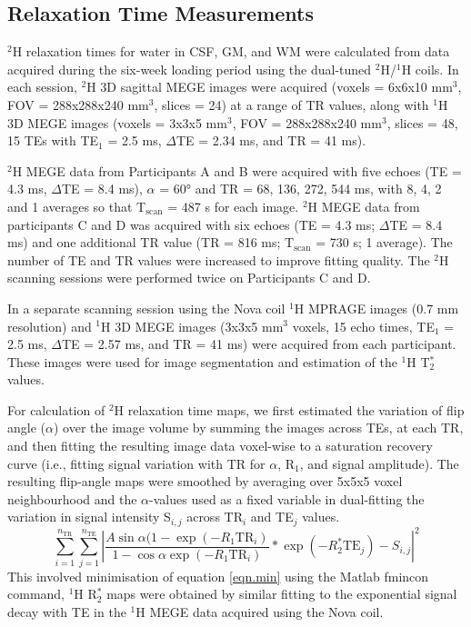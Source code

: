 \subsection{Relaxation Time Measurements}
\label{Chap:D2O:Relaxation}

$^2$H relaxation times for water in \ac{CSF}, \ac{GM}, and \ac{WM} were calculated from data acquired during the six-week loading period using the dual-tuned $^2$H/$^1$H coils. In each session, $^2$H 3D sagittal \ac{MEGE} images were acquired (voxels = 6x6x10 mm$^3$, \ac{FOV} = 288x288x240 mm$^3$, slices = 24) at a range of \ac{TR} values, along with $^1$H 3D \ac{MEGE} images (voxels = 3x3x5 mm$^3$, \ac{FOV} = 288x288x240 mm$^3$, slices = 48, 15 \ac{TE}s with TE$_1$ = 2.5 ms, $\Delta$TE = 2.34 ms, and TR = 41 ms). 

$^2$H \ac{MEGE} data from Participants A and B were acquired with five echoes (\ac{TE} = 4.3 ms, $\Delta$TE = 8.4 ms), $\alpha$ = 60° and \ac{TR} = 68, 136, 272, 544 ms, with 8, 4, 2 and 1 averages so that T$_\text{scan}$ = 487 s for each image. $^2$H \ac{MEGE} data from participants C and D was acquired with six echoes (\ac{TE} = 4.3 ms; $\Delta$TE = 8.4 ms) and one additional \ac{TR} value (TR = 816 ms; T$_\text{scan}$ = 730 s; 1 average). 
The number of \ac{TE} and \ac{TR} values were increased to improve fitting quality. The $^2$H scanning sessions were performed twice on Participants C and D.

In a separate scanning session using the Nova coil $^1$H  \ac{MPRAGE} images (0.7 mm resolution) and $^1$H 3D \ac{MEGE} images (3x3x5 mm$^3$ voxels, 15 echo times, TE$_1$ = 2.5 ms, $\Delta$TE = 2.57 ms, and \ac{TR} = 41 ms) were acquired from each participant. These images were used for image segmentation and estimation of the $^1$H T$_2^*$ values. 

For calculation of $^2$H relaxation time maps, we first estimated the variation of flip angle ($\alpha$) over the image volume by summing the images across \ac{TE}s, at each \ac{TR}, and then fitting the resulting image data voxel-wise to a saturation recovery curve (i.e., fitting signal variation with \ac{TR} for $\alpha$, R$_1$, and signal amplitude). The resulting flip-angle maps were smoothed by averaging over 5x5x5 voxel neighbourhood and the $\alpha$-values used as a fixed variable in dual-fitting the variation in signal intensity S$_{i,j}$ across TR$_i$ and TE$_j$  values. 
\begin{equation}
     \sum_{i=1}^{n_{\text{TR}}}\sum_{j=1}^{n_{\text{TE}}}\left|\frac{A\sin{\alpha}(1-\exp(-R_1 \text{TR}_i)}{1-\cos{\alpha}\exp(-R_1 \text{TR}_i)}*\exp(-R_2^*\text{TE}_j) - S_{i,j}\right|^2
     \label{eqn.min}
\end{equation}
This involved minimisation of equation \ref{eqn.min} using the Matlab fmincon command, $^1$H R$_2^*$ maps were obtained by similar fitting to the exponential signal decay with \ac{TE} in the $^1$H \ac{MEGE} data acquired using the Nova coil.

